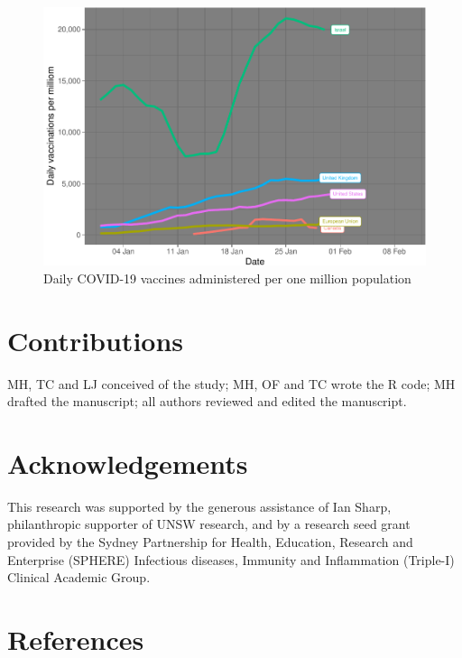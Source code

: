 \documentclass{article}
\begin{document}
\begin{figure}

{\centering \includegraphics{researchNote_files/figure-latex/dailyVac-1} 

}

\caption{Daily COVID-19 vaccines administered per one million population}\label{fig:dailyVac}
\end{figure}

\hypertarget{contributions}{%
\section{Contributions}\label{contributions}}

MH, TC and LJ conceived of the study; MH, OF and TC wrote the R code; MH
drafted the manuscript; all authors reviewed and edited the manuscript.

\hypertarget{acknowledgements}{%
\section{Acknowledgements}\label{acknowledgements}}

This research was supported by the generous assistance of Ian Sharp,
philanthropic supporter of UNSW research, and by a research seed grant
provided by the Sydney Partnership for Health, Education, Research and
Enterprise (SPHERE) Infectious diseases, Immunity and Inflammation
(Triple-I) Clinical Academic Group.

\newpage

\hypertarget{references}{%
\section*{References}\label{references}}
\end{document}

